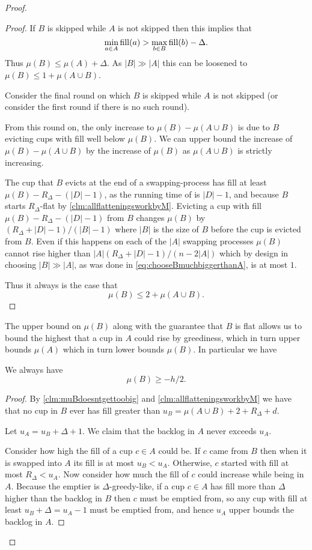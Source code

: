 \begin{proof}
\begin{proof}
  If $B$ is skipped while $A$ is not skipped then this implies that 
  $$\min_{a\in A} \operatorname{\textnormal{fill}}(a) > \max_{b\in B} \operatorname{\textnormal{fill}}(b) - \Delta.$$
  Thus $ \mu(B) \le \mu(A) + \Delta$. As $|B| \gg |A|$ this can be
  loosened to $\mu(B) \le 1 + \mu(A\cup B)$.

  Consider the final round on which $B$ is skipped while $A$ is
  not skipped (or consider the first round if there is no such
  round).

  From this round on, the only increase to $\mu(B) - \mu(A\cup
  B)$ is due to $B$ evicting cups with fill well below $\mu(B)$.
  We can upper bound the increase of $\mu(B)- \mu(A\cup B)$ by the increase
  of $\mu(B)$ as $\mu(A\cup B)$ is strictly increasing.

  The cup that $B$ evicts at the end of a
  swapping-process has fill at least $\mu(B) - R_\Delta -
  (|D|-1)$, as the running time of \randalg is $|D|-1$, and
  because $B$ starts $R_\Delta$-flat by
  \cref{clm:allflatteningsworkbyM}. Evicting a cup
  with fill $\mu(B) - R_\Delta - (|D| -1)$ from $B$ changes
  $\mu(B)$ by $(R_\Delta + |D| - 1) / (|B|-1)$ where $|B|$ is the
  size of $B$ before the cup is evicted from $B$. Even if this
  happens on each of the $|A|$ swapping processes $\mu(B)$ cannot
  rise higher than $|A| (R_\Delta + |D|-1) / (n-2|A|)$ which by
  design in choosing $|B| \gg |A|$, as was done in
  \eqref{eq:chooseBmuchbiggerthanA}, is at most $1$.

  Thus it always is the case that 
  $$\mu(B) \le 2 + \mu(A\cup B).$$

\end{proof}

The upper bound on $\mu(B)$ along with the guarantee that $B$ is
flat allows us to bound the highest that a cup in $A$ could rise
by greediness, which in turn upper bounds $\mu(A)$ which in turn
lower bounds $\mu(B)$. In particular we have
\begin{clm}
  \label{clm:muBgreaterthanminushover2}
  We always have
  $$\mu(B) \ge -h/2.$$
\end{clm}
\begin{proof}
  By \cref{clm:muBdoesntgettoobig} and \cref{clm:allflatteningsworkbyM} 
  we have that no cup in $B$ ever has fill greater than
  $u_B = \mu(A\cup B) + 2 + R_\Delta + d$. 

  Let $u_A = u_B + \Delta + 1$. We claim that the backlog in $A$
  never exceeds $u_A$.

  Consider how high the fill of a cup $c \in A$ could be.
  If $c$ came from $B$ then when it is swapped
  into $A$ its fill is at most $u_B < u_A$. Otherwise, $c$
  started with fill at most $R_\Delta < u_A$. Now consider how
  much the fill of $c$ could increase while being in $A$. Because
  the emptier is $\Delta$-greedy-like, if a cup $c\in A$ has fill
  more than $\Delta$ higher than the backlog in $B$ then $c$ must
  be emptied from, so any cup with fill at least $u_B + \Delta =
  u_A - 1$ must be emptied from, and hence $u_A$ upper bounds the
  backlog in $A$. 


\end{proof}
\end{proof}
